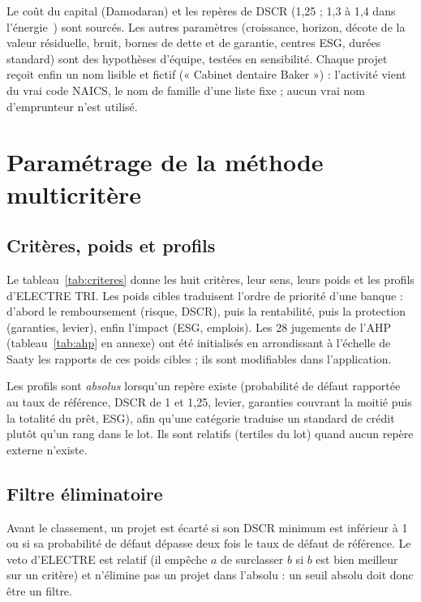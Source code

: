 \begin{encadre}
Le coût du capital (Damodaran) et les repères de DSCR (1,25 ; 1,3 à 1,4 dans l'énergie~\cite{nrel2024}) sont
sourcés. Les autres paramètres (croissance, horizon, décote de la valeur résiduelle, bruit, bornes de dette et de
garantie, centres ESG, durées standard) sont des hypothèses d'équipe, testées en sensibilité. Chaque projet reçoit
enfin un nom lisible et fictif (« Cabinet dentaire Baker ») : l'activité vient du vrai code NAICS, le nom de famille
d'une liste fixe ; aucun vrai nom d'emprunteur n'est utilisé.
\end{encadre}

\section{Paramétrage de la méthode multicritère}

\subsection{Critères, poids et profils}

Le tableau~\ref{tab:criteres} donne les huit critères, leur sens, leurs poids et les profils d'ELECTRE TRI. Les poids
cibles traduisent l'ordre de priorité d'une banque : d'abord le remboursement (risque, DSCR), puis la rentabilité,
puis la protection (garanties, levier), enfin l'impact (ESG, emplois). Les 28 jugements de l'AHP
(tableau~\ref{tab:ahp} en annexe) ont été initialisés en arrondissant à l'échelle de Saaty les rapports de ces poids
cibles ; ils sont modifiables dans l'application.



Les profils sont \emph{absolus} lorsqu'un repère existe (probabilité de défaut rapportée au taux de référence,
DSCR de 1 et 1,25, levier, garanties couvrant la moitié puis la totalité du prêt, ESG), afin qu'une catégorie traduise
un standard de crédit plutôt qu'un rang dans le lot. Ils sont relatifs (tertiles du lot) quand aucun repère externe
n'existe.

\subsection{Filtre éliminatoire}

Avant le classement, un projet est écarté si son DSCR minimum est inférieur à 1 ou si sa probabilité de défaut dépasse
deux fois le taux de défaut de référence. Le veto d'ELECTRE est relatif (il empêche $a$ de surclasser $b$ si $b$ est
bien meilleur sur un critère) et n'élimine pas un projet dans l'absolu : un seuil absolu doit donc être un filtre.

